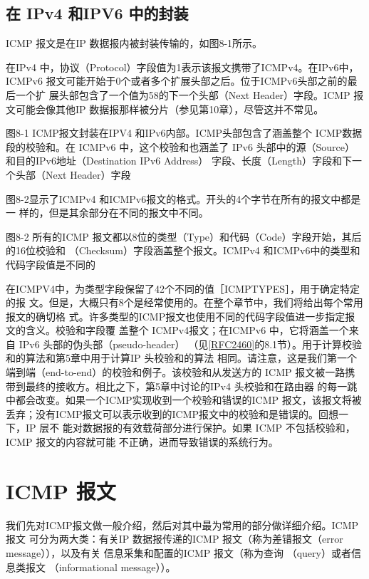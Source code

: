 \subsection{在 IPv4 和IPV6 中的封装}
ICMP 报文是在IP 数据报内被封装传输的，如图8-1所示。

在IPv4 中，协议（Protocol）字段值为1表示该报文携带了ICMPv4。在IPv6中，
ICMPv6 报文可能开始于0个或者多个扩展头部之后。位于ICMPv6头部之前的最后一个扩
展头部包含了一个值为58的下一个头部（Next Header）字段。ICMP 报文可能会像其他IP
数据报那样被分片（参见第10章），尽管这并不常见。

图8-1 ICMP报文封装在IPV4 和IPv6内部。ICMP头部包含了涵盖整个 ICMP数据段的校验和。在
ICMPv6 中，这个校验和也涵盖了 IPv6 头部中的源（Source）和目的IPv6地址（Destination
IPv6 Address） 字段、长度（Length）字段和下一个头部（Next Header）字段

图8-2显示了ICMPv4 和ICMPv6报文的格式。开头的4个字节在所有的报文中都是一
样的，但是其余部分在不同的报文中不同。

图8-2 所有的ICMP 报文都以8位的类型（Type）和代码（Code）字段开始，其后的16位校验和
（Checksum）字段涵盖整个报文。ICMPv4 和ICMPv6中的类型和代码字段值是不同的

在ICMPV4中，为类型字段保留了42个不同的值［ICMPTYPES］，用于确定特定的报
文。但是，大概只有8个是经常使用的。在整个章节中，我们将给出每个常用报文的确切格
式。许多类型的ICMP报文也使用不同的代码字段值进一步指定报文的含义。校验和字段覆
盖整个 ICMPv4报文；在ICMPv6 中，它将涵盖一个来自 IPv6 头部的伪头部（pseudo-header）
（见\href{https://www.rfc-editor.org/rfc/rfc2460}{[RFC2460]}的8.1节）。用于计算校验和的算法和第5章中用于计算IP
头校验和的算法
相同。请注意，这是我们第一个端到端（end-to-end）的校验和例子。该校验和从发送方的
ICMP 报文被一路携带到最终的接收方。相比之下，第5章中讨论的IPv4 头校验和在路由器
的每一跳中都会改变。如果一个ICMP实现收到一个校验和错误的ICMP 报文，该报文将被
丢弃；没有ICMP报文可以表示收到的ICMP报文中的校验和是错误的。回想一下，IP 层不
能对数据报的有效载荷部分进行保护。如果 ICMP 不包括校验和，ICMP 报文的内容就可能
不正确，进而导致错误的系统行为。

\section{ICMP 报文}

我们先对ICMP报文做一般介绍，然后对其中最为常用的部分做详细介绍。ICMP报文
可分为两大类：有关IP 数据报传递的ICMP 报文（称为差错报文（error message）），以及有关
信息采集和配置的ICMP 报文（称为查询 （query）或者信息类报文 （informational message））。
